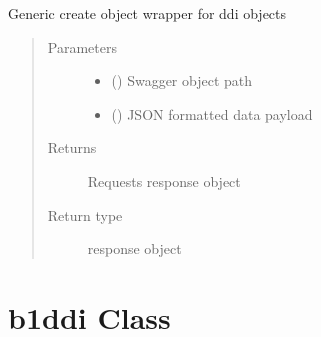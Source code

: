 \documentclass[letterpaper,10pt,english]{sphinxmanual}
\begin{document}
\begin{fulllineitems}
\begin{fulllineitems}
\label{\detokenize{b1cdc-class:bloxone.b1cdc.update}}
\sphinxAtStartPar
Generic create object wrapper for ddi objects
\begin{quote}\begin{description}
\item[{Parameters}] \leavevmode\begin{itemize}
\item {} 
\sphinxAtStartPar
{} () \textendash{} Swagger object path

\item {} 
\sphinxAtStartPar
{} () \textendash{} JSON formatted data payload

\end{itemize}

\item[{Returns}] \leavevmode
\sphinxAtStartPar
Requests response object

\item[{Return type}] \leavevmode
\sphinxAtStartPar
response object

\end{description}\end{quote}

\end{fulllineitems}


\end{fulllineitems}



\section{b1ddi Class}
\label{\detokenize{b1ddi-class:b1ddi-class}}\label{\detokenize{b1ddi-class::doc}}
\end{document}
